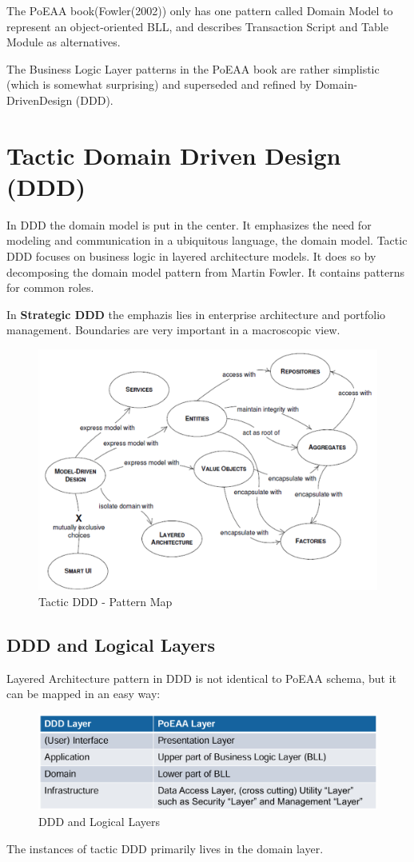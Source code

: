 \documentclass[../Main.tex]{subfiles}
\begin{document}
The PoEAA book(Fowler(2002)) only has one pattern called Domain Model to represent an object-oriented BLL,
and describes Transaction Script and Table Module as alternatives. 

The Business Logic Layer patterns in the PoEAA book are rather simplistic (which is somewhat surprising) and
superseded and refined by Domain-DrivenDesign (DDD).

\section{Tactic Domain Driven Design (DDD)}
In DDD the domain model is put in the center. It emphasizes the need for
modeling and communication in a ubiquitous language, the domain model.
Tactic DDD focuses on business logic in layered architecture models.
It does so by decomposing the domain model pattern from Martin Fowler.
It contains patterns for common roles.

In \textbf{Strategic DDD} the emphazis lies in enterprise architecture and
portfolio management. Boundaries are very important in a macroscopic view.

\begin{figure}[H]
    \centering
    \includegraphics[width=1\linewidth]{Images/patternmap-tactic-ddd.png}
    \caption{Tactic DDD - Pattern Map}
\end{figure}

\subsection{DDD and Logical Layers}
Layered Architecture pattern in DDD is not identical to PoEAA schema, but
it can be mapped in an easy way:
\begin{figure}[H]
    \centering
    \includegraphics[width=1\linewidth]{Images/ddd-logical-layers.png}
    \caption{DDD and Logical Layers}
\end{figure}
The instances of tactic DDD primarily lives in the domain layer.
\end{document}

